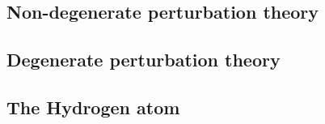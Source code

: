 \subsection{Non-degenerate perturbation theory}
\subsection{Degenerate perturbation theory}
\subsection{The Hydrogen atom}